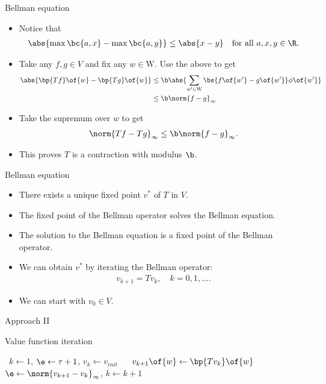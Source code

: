 \documentclass[11pt,xcolor={dvipsnames},aspectratio=159,hyperref={pdftex,pdfpagemode=UseNone,hidelinks,pdfdisplaydoctitle=true},usepdftitle=false]{beamer}
\begin{document}
\begin{frame}{Bellman equation}
    \begin{itemize}
        \item Notice that \begin{align*}
            \abs{\max\bc{a,x} - \max\bc{a,y}} \leq \abs{x-y} \quad \text{for all } a,x,y \in \R.
        \end{align*}
        \item Take any $f,g\in V$ and fix any $w\in\text{W}$. Use the above to get 
        \begin{align*}
            \abs{\bp{Tf}\of{w} - \bp{Tg}\of{w}}  & \leq \b\abs{\sum_{w^\prime \in \text{W}} \bs{f\of{w^\prime}-g\of{w^\prime}}\phi\of{w^\prime}} \\ 
            & \leq \b \norm{f-g}_\infty
        \end{align*}
        \item Take the supremum over $w$ to get \begin{align*}
            \norm{Tf-Tg}_\infty \leq \b \norm{f-g}_\infty.
        \end{align*}
        \item This proves $T$ is a contraction with modulus $\b$.
    \end{itemize}
    \end{frame}


\begin{frame}{Bellman equation}
    \begin{itemize}
        \item There exists a unique fixed point $v^*$ of $T$ in $V$. 
        \item The fixed point of the Bellman operator solves the Bellman equation. 
        \item The solution to the Bellman equation is a fixed point of the Bellman operator.
        \item We can obtain $v^*$ by iterating the Bellman operator: \begin{align*}
            v_{k+1} = Tv_k, \quad k=0,1,\ldots.
        \end{align*}
        \item We can start with  $v_0 \in V$.
    \end{itemize}
    \end{frame}

\begin{frame}{Approach II}
    \begin{algorithm}[H]
        \caption{Value function iteration}
        \begin{algorithmic}[1]
         \
        \State $k \gets 1$, $\e \gets \tau + 1$, $v_k \gets v_{init}$
        \While{$\e>\tau$} \
        \For{$w \in \text{W}$} \
        \State $v_{k+1}\of{w} \gets \bp{Tv_{k}}\of{w}$
        \EndFor
        \State $\e \gets \norm{v_{k+1}-v_k}_\infty$, $k \gets k+1$
        \EndWhile
        
        \EndProcedure
        \end{algorithmic}
        \end{algorithm}
\end{frame}
\end{document}

